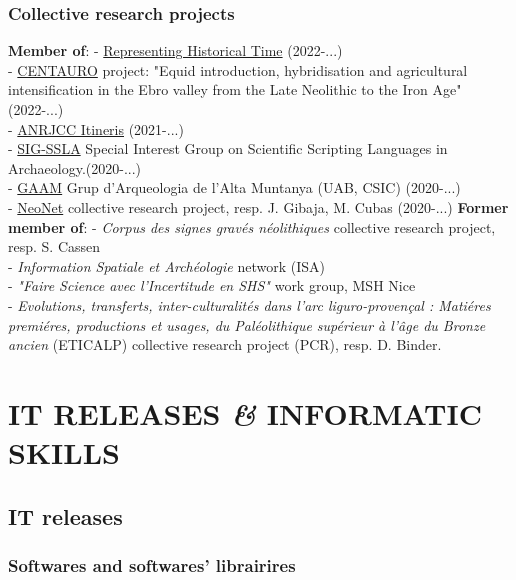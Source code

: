 \documentclass{article}
\begin{document}
\subsubsection*{Collective research projects}

\textbf{Member of}:
- \href{https://github.com/historical-time}{Representing Historical Time} (2022-...)\\ 
- \href{https://www.centaur-o.com/}{CENTAURO} project: "Equid introduction, hybridisation and agricultural intensification in the Ebro valley from the Late Neolithic to the Iron Age" (2022-...)\\
- \href{https://anr.fr/Project-ANR-21-CE27-0010}{ANRJCC Itineris} (2021-...)\\ 
- \href{https://sslarch.github.io/}{SIG-SSLA} Special Interest Group on Scientific Scripting Languages in Archaeology.(2020-...)\\ 
- \href{https://arqueologiademuntanya.wordpress.com/}{GAAM} Grup d'Arqueologia de l'Alta Muntanya (UAB, CSIC) (2020-...)\\ 
- \href{https://redneonet.com/}{NeoNet} collective research project, resp. J. Gibaja, M. Cubas (2020-...)
\smallbreak
\textbf{Former member of}:
- \textit{Corpus des signes grav\'{e}s n\'{e}olithiques} collective research project, resp. S. Cassen\\
- \textit{Information Spatiale et Arch\'{e}ologie} network (ISA)\\ 
- \textit{"Faire Science avec l'Incertitude en SHS"} work group, MSH Nice\\ 
- \textit{Evolutions, transferts, inter-culturalit\'{e}s dans l'arc liguro-proven\c{c}al : Mati\'{e}res premi\'{e}res, productions et usages, du Pal\'{e}olithique sup\'{e}rieur \`{a} l'\^{a}ge du Bronze ancien} (ETICALP) collective research project (PCR), resp. D. Binder.


\section{IT RELEASES \textit{\&} INFORMATIC SKILLS}

\subsection*{IT releases}

\subsubsection*{Softwares and softwares' librairires}
\end{document}
